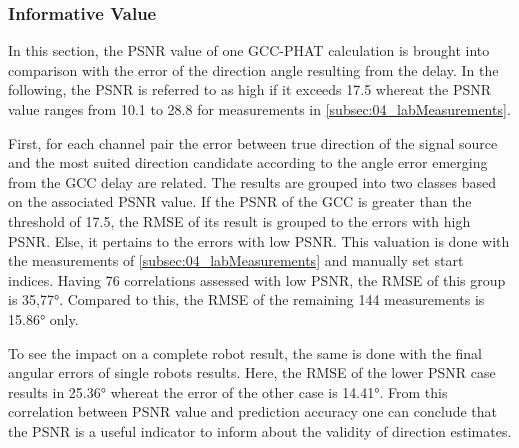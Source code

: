 \subsubsection*{Informative Value}

In this section, the \ac{PSNR} value of one \ac{GCC-PHAT} calculation is brought
into comparison with the error of the direction angle resulting from the delay.
In the following, the \ac{PSNR} is referred to as high if it exceeds 17.5
whereat the \ac{PSNR} value ranges from 10.1 to 28.8 for measurements in
\cref{subsec:04_labMeasurements}.

First, for each channel pair the error between true direction of the signal source
and the most suited direction candidate according to the angle error
emerging from the \ac{GCC} delay are related.
The results are grouped into two classes based on the associated \ac{PSNR} value.
If the \ac{PSNR} of the \ac{GCC} is greater than the threshold of 17.5,
the \ac{RMSE} of its result is grouped to the errors with high \ac{PSNR}.
Else, it pertains to the errors with low \ac{PSNR}.
This valuation is done with the measurements of \cref{subsec:04_labMeasurements}
and manually set start indices.
Having 76 correlations assessed with low \ac{PSNR}, the \ac{RMSE} of this group
is 35,77\si{\degree}.
Compared to this, the \ac{RMSE} of the remaining 144 measurements
is 15.86\si{\degree} only.

To see the impact on a complete robot result, the same is done
with the final angular errors of single robots results.
Here, the \ac{RMSE} of the lower \ac{PSNR} case results in 25.36\si{\degree}
whereat the error of the other case is 14.41\si{\degree}.
From this correlation between PSNR value and prediction accuracy one can
conclude that the PSNR is a useful indicator to inform about the validity of
direction estimates.


